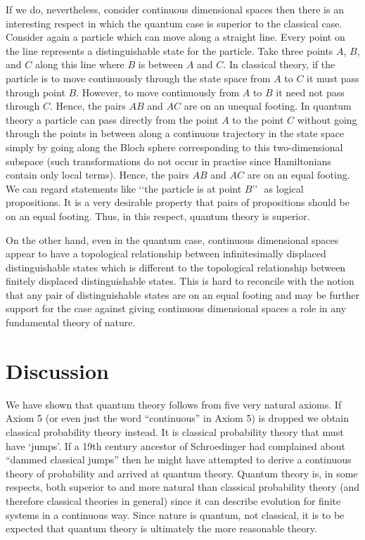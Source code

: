 \documentclass[12pt]{article}
\begin{document}
If we do, nevertheless, consider continuous dimensional spaces then there
is an interesting respect in which the quantum case is superior to the
classical case.  Consider again a particle which can move along a
straight line. Every point on the line represents a distinguishable
state for the particle.  Take three points $A$, $B$, and $C$ along this
line where $B$ is between $A$ and $C$.  In classical theory, if the
particle is to move continuously through the state space from $A$ to $C$
it must pass through point $B$.  However, to move continuously from $A$
to $B$ it need not pass through $C$.  Hence, the pairs $AB$ and $AC$ are
on an unequal footing.  In quantum theory a particle can pass directly
from the point $A$ to the point $C$ without going through the points in
between along a continuous trajectory in the state space simply by
going along the Bloch sphere corresponding to this two-dimensional
subspace (such transformations do not occur in practise since
Hamiltonians contain only local terms).  Hence, the pairs $AB$ and $AC$
are on an equal footing. We can regard statements like \lq\lq the
particle is at point $B$\rq\rq\,\,  as logical propositions. It is
a very desirable property that pairs of propositions should be on an
equal footing.  Thus, in this respect, quantum theory is superior.

On the other hand, even in the quantum case,
continuous dimensional spaces appear to have a topological relationship
between infinitesimally displaced distinguishable states which is
different to the topological relationship between finitely displaced
distinguishable states. This is hard to reconcile with the notion that
any pair of distinguishable states are on an equal footing and may be
further support for the case against giving continuous dimensional
spaces a role in any fundamental theory of nature.




\section{Discussion}

We have shown that quantum theory follows from five very natural axioms.
If Axiom 5 (or even just the word ``continuous'' in Axiom 5)
is dropped we obtain classical probability theory instead.  It is classical
probability theory that must have \lq jumps\rq.  If a 19th century ancestor
of Schroedinger had complained about ``dammed classical jumps''
then he might have attempted to derive a continuous theory of
probability and arrived at quantum theory.  Quantum theory is, in some
respects, both superior to and more natural than classical probability
theory (and
therefore classical theories in general) since it can describe evolution for
finite systems in a continuous way.  Since nature is quantum,
not classical, it is to be expected that quantum theory
is ultimately the more reasonable theory.
\end{document}
